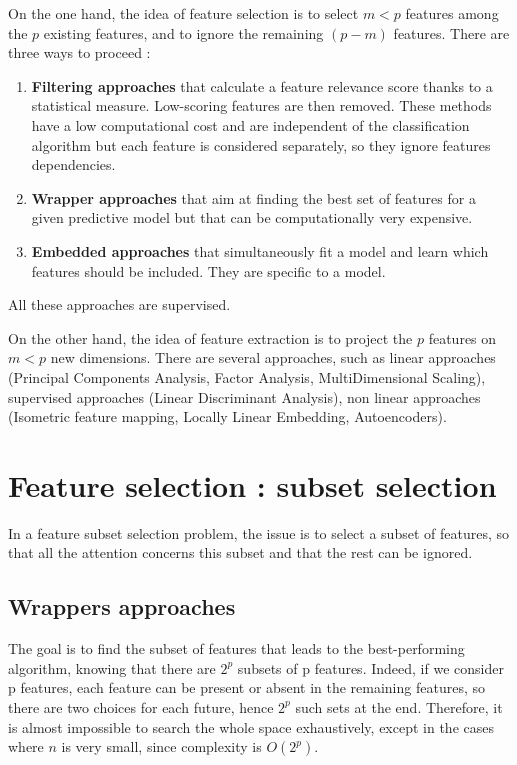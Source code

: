 \documentclass{article}
\begin{document}
On the one hand, the idea of feature selection is to select $m<p$ features among the $p$ existing features, and to ignore the remaining $(p-m)$ features. There are three ways to proceed :
\begin{enumerate}
    \item \textbf{Filtering approaches} that calculate a feature relevance score thanks to a statistical measure. Low-scoring features are then removed. These methods have a low computational cost and are independent of the classification algorithm but each feature is considered separately, so they ignore features dependencies.
    
    \item \textbf{Wrapper approaches} that aim at finding the best set of features for a given predictive model but that can be computationally very expensive.
    
    \item \textbf{Embedded approaches} that simultaneously fit a model and learn which features should be included. They are specific to a model.
\end{enumerate}

All these approaches are supervised.

\bigskip
On the other hand, the idea of feature extraction is to project the $p$ features on $m<p$ new dimensions. There are several approaches, such as linear approaches (Principal Components Analysis, Factor Analysis, MultiDimensional Scaling), supervised approaches (Linear Discriminant Analysis), non linear approaches (Isometric feature mapping, Locally Linear Embedding, Autoencoders).


\section{Feature selection : subset selection}
In a feature subset selection problem, the issue is to select a subset of features, so that all the attention concerns this subset and that the rest can be ignored.


\subsection{Wrappers approaches}

The goal is to find the subset of features that leads to the best-performing algorithm, knowing that there are $2^p$ subsets of p features. Indeed, if we consider p features, each feature can be present or  absent in the remaining features, so there are two choices for each future, hence $2^p$ such sets at the end.
Therefore, it is almost impossible to search the whole space exhaustively, except in the cases where $n$ is very small, since complexity is $O(2^p)$.
\bigskip
\end{document}
